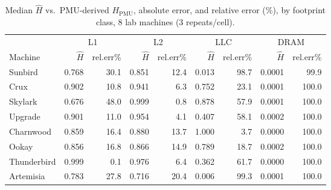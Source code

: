 \documentclass{article}
\begin{document}
\begin{table}[H]
\centering\scriptsize
\caption{Median $\widehat{H}$ vs.\ PMU-derived $H_{\text{PMU}}$, absolute error, and relative error (\%), by footprint class, 8 lab machines (3 repeats/cell).}
\begin{tabular}{|l|r|r|r|r|r|r|r|r|}
\hline
 & \multicolumn{2}{c|}{L1} & \multicolumn{2}{c|}{L2} & \multicolumn{2}{c|}{LLC} & \multicolumn{2}{c|}{DRAM}\\
Machine & $\widehat{H}$ & rel.err\% & $\widehat{H}$ & rel.err\% & $\widehat{H}$ & rel.err\% & $\widehat{H}$ & rel.err\%\\
\hline
Sunbird & 0.768 & 30.1 & 0.851 & 12.4 & 0.013 & 98.7 & 0.0001 & 99.9\\
Crux & 0.902 & 10.8 & 0.941 & 6.3 & 0.752 & 23.1 & 0.0001 & 100.0\\
Skylark & 0.676 & 48.0 & 0.999 & 0.8 & 0.878 & 57.9 & 0.0001 & 100.0\\
Upgrade & 0.901 & 11.0 & 0.954 & 4.1 & 0.407 & 58.1 & 0.0002 & 100.0\\
Charnwood & 0.859 & 16.4 & 0.880 & 13.7 & 1.000 & 3.7 & 0.0000 & 100.0\\
Ookay & 0.856 & 16.8 & 0.866 & 14.9 & 0.789 & 18.7 & 0.0002 & 100.0\\
Thunderbird & 0.999 & 0.1 & 0.976 & 6.4 & 0.362 & 61.7 & 0.0000 & 100.0\\
Artemisia & 0.783 & 27.8 & 0.716 & 20.4 & 0.006 & 99.3 & 0.0001 & 100.0\\
\hline
\end{tabular}
\end{table}
\end{document}
